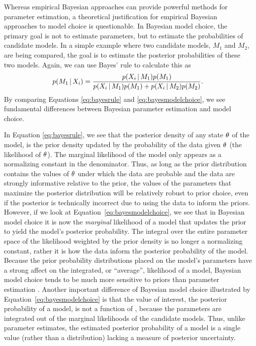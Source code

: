 \begin{linenomath}
Whereas empirical Bayesian approaches can provide powerful methods for
parameter estimation, a theoretical justification for empirical Bayesian
approaches to model choice is questionable.
In Bayesian model choice, the primary goal is not to estimate parameters, but
to estimate the probabilities of candidate models.
In a simple example where two candidate models, $M_1$ and $M_2$, are being
compared, the goal is to estimate the posterior probabilities of these two
models.
Again, we can use Bayes' rule to calculate this as
\begin{equation}
    p(M_1 \given \alignment{i}{}) = \frac{p(\alignment{i}{} \given
    M_1)p(M_1)}{p(\alignment{i}{} \given M_1)p(M_1) + p(\alignment{i}{} \given
    M_2)p(M_2)}.
    \label{eq:bayesmodelchoice}
\end{equation}
By comparing Equations \ref{eq:bayesrule} and \ref{eq:bayesmodelchoice}, we
see fundamental differences between Bayesian parameter estimation and
model choice.
\end{linenomath}

In Equation \ref{eq:bayesrule}, we see that the posterior density of any state
$\theta_{}$ of the model, is the prior density updated by the probability of
the data given $\theta_{}$ (the likelihood of $\theta_{}$).
The marginal likelihood of the model only appears as a normalizing constant in
the denominator.
Thus, as long as the prior distribution contains the values of $\theta_{}$
under which the data are probable and the data are strongly informative
relative to the prior, the values of the parameters that maximize the posterior
distribution will be relatively robust to prior choice, even if the posterior
is technically incorrect due to using the data to inform the priors.
However, if we look at Equation~\ref{eq:bayesmodelchoice}, we see that in
Bayesian model choice it is now the \emph{marginal} likelihood of a model that
updates the prior to yield the model's posterior probability.
The integral over the entire parameter space of the likelihood weighted by the
prior density is no longer a normalizing constant, rather it is how the data
inform the posterior probability of the model.
Because the prior probability distributions placed on the model's parameters
have a strong affect on the integrated, or ``average'', likelihood of a model,
Bayesian model choice tends to be much more sensitive to priors than parameter
estimation \citep{Jeffreys1939,Lindley1957}.
Another important difference of Bayesian model choice illustrated by
Equation~\ref{eq:bayesmodelchoice} is that the value of interest, the posterior
probability of a model, is not a function of \myTheta{}, because the parameters
are integrated out of the marginal likelihoods of the candidate models.
Thus, unlike parameter estimates, the estimated posterior probability of a
model is a single value (rather than a distribution) lacking a measure of
posterior uncertainty.


